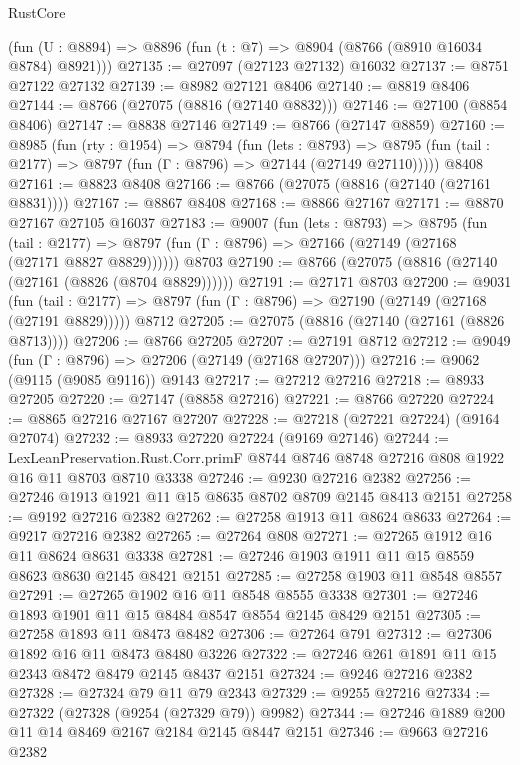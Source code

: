 \begin{lexlean}{RustCore}
\begin{coremodule}
    (fun (U : @8894) => @8896 (fun (t : @7) => @8904 (@8766 (@8910 @16034 @8784) @8921)))
@27135 := @27097 (@27123 @27132) @16032
@27137 := @8751 @27122 @27132
@27139 := @8982 @27121 @8406
@27140 := @8819 @8406
@27144 := @8766 (@27075 (@8816 (@27140 @8832)))
@27146 := @27100 (@8854 @8406)
@27147 := @8838 @27146
@27149 := @8766 (@27147 @8859)
@27160 := @8985
    (fun (rty : @1954) =>
    @8794
      (fun (lets : @8793) =>
      @8795 (fun (tail : @2177) => @8797 (fun (Γ : @8796) => @27144 (@27149 @27110)))))
    @8408
@27161 := @8823 @8408
@27166 := @8766 (@27075 (@8816 (@27140 (@27161 @8831))))
@27167 := @8867 @8408
@27168 := @8866 @27167
@27171 := @8870 @27167 @27105 @16037
@27183 := @9007
    (fun (lets : @8793) =>
    @8795
      (fun (tail : @2177) =>
      @8797 (fun (Γ : @8796) => @27166 (@27149 (@27168 (@27171 @8827 @8829))))))
    @8703
@27190 := @8766 (@27075 (@8816 (@27140 (@27161 (@8826 (@8704 @8829))))))
@27191 := @27171 @8703
@27200 := @9031
    (fun (tail : @2177) => @8797 (fun (Γ : @8796) => @27190 (@27149 (@27168 (@27191 @8829)))))
    @8712
@27205 := @27075 (@8816 (@27140 (@27161 (@8826 @8713))))
@27206 := @8766 @27205
@27207 := @27191 @8712
@27212 := @9049 (fun (Γ : @8796) => @27206 (@27149 (@27168 @27207)))
@27216 := @9062 (@9115 (@9085 @9116)) @9143
@27217 := @27212 @27216
@27218 := @8933 @27205
@27220 := @27147 (@8858 @27216)
@27221 := @8766 @27220
@27224 := @8865 @27216 @27167 @27207
@27228 := @27218 (@27221 @27224) (@9164 @27074)
@27232 := @8933 @27220 @27224 (@9169 @27146)
@27244 := LexLeanPreservation.Rust.Corr.primF
    @8744
    @8746
    @8748
    @27216
    @808
    @1922
    @16
    @11
    @8703
    @8710
    @3338
@27246 := @9230 @27216 @2382
@27256 := @27246 @1913 @1921 @11 @15 @8635 @8702 @8709 @2145 @8413 @2151
@27258 := @9192 @27216 @2382
@27262 := @27258 @1913 @11 @8624 @8633
@27264 := @9217 @27216 @2382
@27265 := @27264 @808
@27271 := @27265 @1912 @16 @11 @8624 @8631 @3338
@27281 := @27246 @1903 @1911 @11 @15 @8559 @8623 @8630 @2145 @8421 @2151
@27285 := @27258 @1903 @11 @8548 @8557
@27291 := @27265 @1902 @16 @11 @8548 @8555 @3338
@27301 := @27246 @1893 @1901 @11 @15 @8484 @8547 @8554 @2145 @8429 @2151
@27305 := @27258 @1893 @11 @8473 @8482
@27306 := @27264 @791
@27312 := @27306 @1892 @16 @11 @8473 @8480 @3226
@27322 := @27246 @261 @1891 @11 @15 @2343 @8472 @8479 @2145 @8437 @2151
@27324 := @9246 @27216 @2382
@27328 := @27324 @79 @11 @79 @2343
@27329 := @9255 @27216
@27334 := @27322 (@27328 (@9254 (@27329 @79)) @9982)
@27344 := @27246 @1889 @200 @11 @14 @8469 @2167 @2184 @2145 @8447 @2151
@27346 := @9663 @27216 @2382

\end{coremodule}
\end{lexlean}
